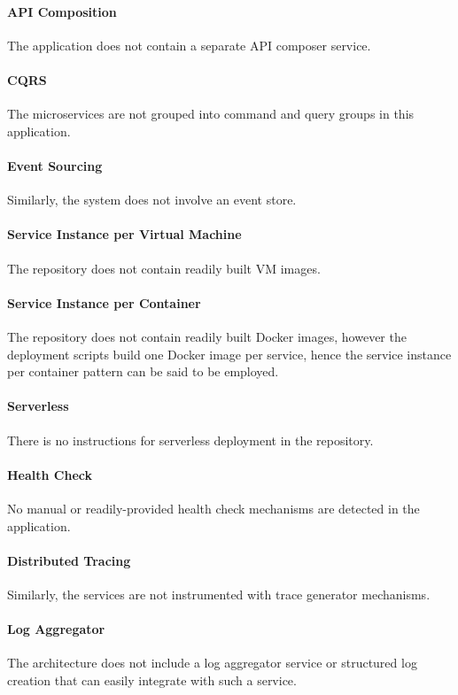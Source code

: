 \documentclass{Configuration_Files/PoliMi3i_thesis}
\begin{document}
\paragraph{API Composition} The application does not contain a separate API composer service.

\paragraph{CQRS} The microservices are not grouped into command and query groups in this application.

\paragraph{Event Sourcing} Similarly, the system does not involve an event store.

\paragraph{Service Instance per Virtual Machine} The repository does not contain readily built VM images.

\paragraph{Service Instance per Container} The repository does not contain readily built Docker images, however the deployment scripts build one Docker image per service, hence the service instance per container pattern can be said to be employed.

\paragraph{Serverless} There is no instructions for serverless deployment in the repository.

\paragraph{Health Check} No manual or readily-provided health check mechanisms are detected in the application.

\paragraph{Distributed Tracing} Similarly, the services are not instrumented with trace generator mechanisms.

\paragraph{Log Aggregator} The architecture does not include a log aggregator service or structured log creation that can easily integrate with such a service.
\end{document}
